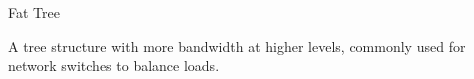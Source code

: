 \documentclass[a4paper, 10pt]{book}
\begin{document}
                    \hfill
                    \begin{minipage}{0.49\linewidth}
                        \begin{tcolorbox}[colframe=black!50, colback=white, size=small]
                            
                            {\bold Fat Tree}
                            
                            A tree structure with more bandwidth at higher levels, commonly used for network switches to balance loads.

                            \begin{center}
                                \begin{tikzpicture}

                                    
                                    
                                \end{tikzpicture}
                            \end{center}
                            
                        \end{tcolorbox}
                    \end{minipage}
                    
\end{document}
